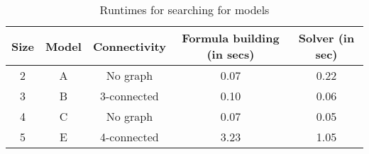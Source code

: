 \begin{table}[t]
  \centering
  \begin{tabular}[t]{|c|c|c|c|c|}\hline
    Size & Model & Connectivity &Formula building (in secs) & Solver (in sec) \\\hline
    2 & A & No graph & 0.07 & 0.22 \\\hline
    3 & B & 3-connected & 0.10 & 0.06 \\\hline
    4 & C & No graph & 0.07 & 0.05 \\\hline
    5 & E & 4-connected & 3.23 & 1.05 \\\hline

  \end{tabular}
  \caption{Runtimes for searching for models}
  \label{tab:qf-grabh}
\end{table}


